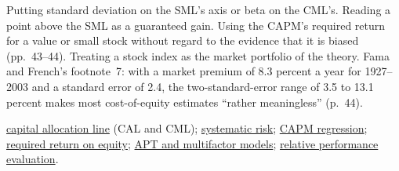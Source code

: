 \begin{qfmodel}
\begin{center}

\end{center}

 Putting standard deviation on the SML's axis or beta on the CML's. Reading a point above the SML as a guaranteed gain. Using the CAPM's required return for a value or small stock without regard to the evidence that it is biased (pp.~43--44). Treating a stock index as the market portfolio of the theory. Fama and French's footnote~7: with a market premium of 8.3 percent a year for 1927--2003 and a standard error of 2.4, the two-standard-error range of 3.5 to 13.1 percent makes most cost-of-equity estimates ``rather meaningless'' (p.~44).

 \hyperref[meth:capital-allocation-line]{capital allocation line} (CAL and CML); \hyperref[mech:systematic-risk-pricing]{systematic risk}; \hyperref[meth:capm-regression]{CAPM regression}; \hyperref[meth:required-return-on-equity]{required return on equity}; \hyperref[mod:multifactor-apt]{APT and multifactor models}; \hyperref[meth:relative-performance-evaluation]{relative performance evaluation}.

\end{qfmodel}

